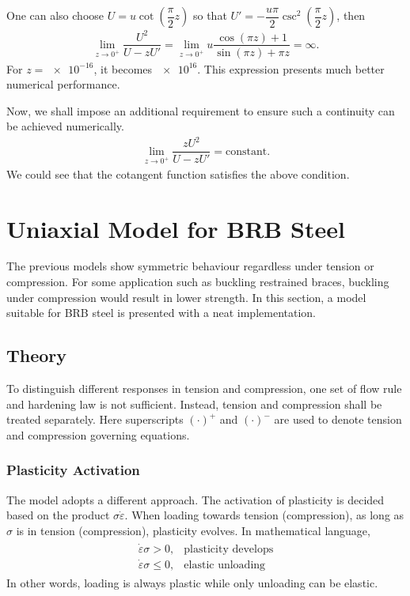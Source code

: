 One can also choose $U=u\cot\left(\dfrac{\pi}{2}z\right)$ so that $U'=-\dfrac{u\pi}{2}\csc^2\left(\dfrac{\pi}{2}z\right)$, then
\begin{gather}
\lim\limits_{z\rightarrow0^+}\dfrac{U^2}{U-zU'}=\lim\limits_{z\rightarrow0^+}u\dfrac{\cos\left(\pi{}z\right)+1}{\sin\left(\pi{}z\right)+\pi{}z}=\infty.
\end{gather}
For $z=\num{e-16}$, it becomes $\num{e16}$.
This expression presents much better numerical performance.

Now, we shall impose an additional requirement to ensure such a continuity can be achieved numerically.
\begin{gather}
\lim\limits_{z\rightarrow0^+}\dfrac{zU^2}{U-zU'}=\text{constant}.
\end{gather}
We could see that the cotangent function satisfies the above condition.
\section{Uniaxial Model for BRB Steel}\label{sec:uniaxial_brb}
The previous models show symmetric behaviour regardless under tension or compression. For some application such as buckling restrained braces, buckling under compression would result in lower strength. In this section, a model \cite{Zona2012} suitable for BRB steel is presented with a neat implementation.
\subsection{Theory}
To distinguish different responses in tension and compression, one set of flow rule and hardening law is not sufficient. Instead, tension and compression shall be treated separately. Here superscripts $\left(\cdot\right)^+$ and $\left(\cdot\right)^-$ are used to denote tension and compression governing equations.
\subsubsection{Plasticity Activation}
The model adopts a different approach. The activation of plasticity is decided based on the product $\sigma\dot{\varepsilon}$. When loading towards tension (compression), as long as $\sigma$ is in tension (compression), plasticity evolves. In mathematical language,
\begin{gather}
\begin{array}{ll}
\dot{\varepsilon}\sigma>0,&\text{plasticity develops}\\
\dot{\varepsilon}\sigma\leqslant0,&\text{elastic unloading}
\end{array}
\end{gather}
In other words, loading is always plastic while only unloading can be elastic.
